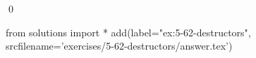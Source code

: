
\begin{ex}
  \label{ex:5-62-destructors}
  
  \qed
\end{ex}
\begin{python0}
from solutions import *
add(label="ex:5-62-destructors",
    srcfilename='exercises/5-62-destructors/answer.tex')
\end{python0}
